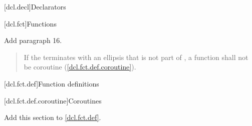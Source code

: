 
[dcl.decl]{Declarators}

\setcounter{section}{3}
\setcounter{subsection}{4}
[dcl.fct]{Functions}%

Add paragraph 16.

\begin{quote}
\setcounter{Paras}{15}
\pnum
If the  terminates with an ellipsis that is not part of , a function shall not be coroutine (\ref{dcl.fct.def.coroutine}).
\end{quote}

\setcounter{section}{3}
[dcl.fct.def]{Function definitions}

\setcounter{subsection}{3}
[dcl.fct.def.coroutine]{Coroutines}

Add this section to \ref{dcl.fct.def}.


